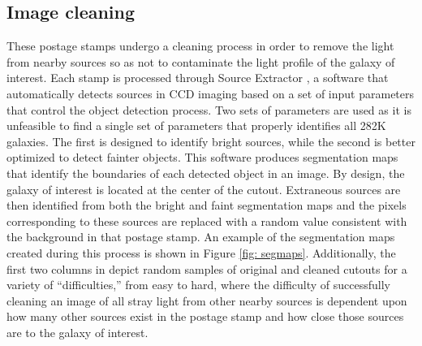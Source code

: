 \subsection{Image cleaning}

These postage stamps undergo a cleaning process in order to remove the light from nearby sources so as not to contaminate the light profile of the galaxy of interest. Each stamp is processed through Source Extractor \citep[ver. 2.8.6;][]{sextractor}, a software that automatically detects sources in CCD imaging based on a set of input parameters that control the object detection process. Two sets of parameters are used as it is unfeasible to find a single set of parameters that properly identifies all 282K galaxies. The first is designed to identify bright sources, while the second is better optimized to detect fainter objects. This software produces segmentation maps that identify the boundaries of each detected object in an image. By design, the galaxy of interest is located at the center of the cutout. Extraneous sources are then identified from both the bright and faint segmentation maps and the pixels corresponding to these sources are replaced with a random value consistent with the background in that postage stamp.  An example of the segmentation maps created during this process is shown in Figure \ref{fig: segmaps}. Additionally, the first two columns in  depict random samples of original and cleaned cutouts for a variety of ``difficulties,'' from easy to hard, where the difficulty of successfully cleaning an image of all stray light from other nearby sources is dependent upon how many other sources exist in the postage stamp and how close those sources are to the galaxy of interest. 


